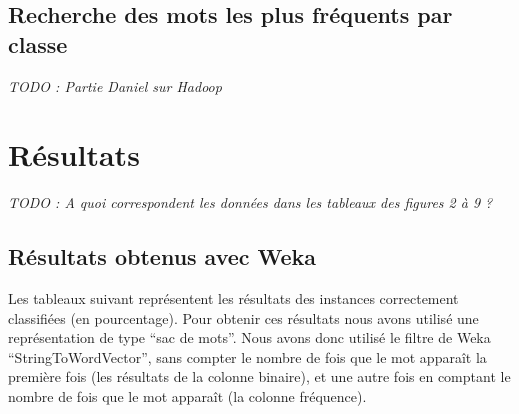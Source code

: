 \documentclass[a4paper, 11pt]{article}
\begin{document}
\subsection{Recherche des mots les plus fréquents par classe}

\textit{TODO : Partie Daniel sur Hadoop \\}

\section{Résultats}

\textit{TODO : A quoi correspondent les données dans les tableaux des figures 2 à 9 ?\\}

\subsection{Résultats obtenus avec Weka}

Les tableaux suivant représentent les résultats des instances correctement classifiées (en pourcentage). Pour obtenir ces résultats nous avons utilisé une représentation de type ``sac de mots''. Nous avons donc utilisé le filtre de Weka ``StringToWordVector'', sans compter le nombre de fois que le mot apparaît la première fois (les résultats de la colonne binaire), et une autre fois en comptant le nombre de fois que le mot apparaît (la colonne fréquence).
\end{document}
